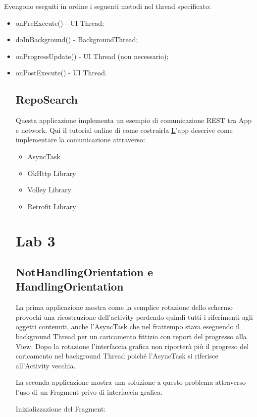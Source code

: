 Evengono eseguiti in ordine i seguenti metodi nel thread specificato:
\begin{itemize}
	\item onPreExecute() - UI Thread;
	\item doInBackground() - BackgroundThread;
	\item onProgressUpdate() - UI Thread (non necessario);
	\item onPostExecute() - UI Thread.
	
	
	\subsection{RepoSearch}
	Questa applicazione implementa un esempio di comunicazione REST tra App e network. Qui il tutorial online di come costruirla \href{https://www.raywenderlich.com/126770/android-networking-tutorial-getting-started}
	
	L'app descrive come implementare la comunicazione attraverso:
	\begin{itemize}
		\item AsyncTask
		\item OkHttp Library
		\item Volley Library
		\item Retrofit Library
	\end{itemize}
	
	
	\section{Lab 3}
	
	\subsection{NotHandlingOrientation e HandlingOrientation}
	La prima applicazione mostra come la semplice rotazione dello schermo provochi una ricostruzione dell'activity perdendo quindi tutti i riferimenti agli oggetti contenuti, anche l'AsyncTask che nel frattempo stava eseguendo il background Thread per un caricamento fittizio con report del progresso alla View. Dopo la rotazione l'interfaccia grafica non riporterà più il progreso del caricamento nel background Thread poiché l'AsyncTask si riferisce all'Activity vecchia.
	
	La seconda applicazione mostra una soluzione a questo problema attraverso l'uso di un Fragment privo di interfaccia grafica.
	
	Inizializzazione del Fragment:
	

\end{itemize}

